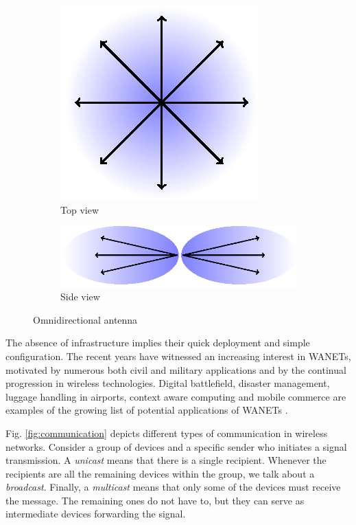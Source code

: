 \begin{figure}[htb!]
    \centering
    \begin{subfigure}[b]{0.35\textwidth}
        \includegraphics{figurer/omni-top.eps}
        \caption{Top view}
        \label{fig:omni-top}
    \end{subfigure}
    \begin{subfigure}[b]{0.55\textwidth}
        \includegraphics{figurer/omni-side.eps}
        \caption{Side view}
        \label{fig:omni-side}
    \end{subfigure}
  \label{fig:omni}
  \caption{Omnidirectional antenna}
\end{figure}

The absence of infrastructure implies their quick deployment and simple configuration.
The recent years have witnessed an increasing interest in WANETs, motivated by numerous both civil and military applications and by the continual progression in wireless technologies.
Digital battlefield, disaster management, luggage handling in airports, context aware computing and mobile commerce are examples of the growing list of potential applications of WANETs \cite{younis06}.

Fig. \ref{fig:communication} depicts different types of communication in wireless networks.
Consider a group of devices and a specific sender who initiates a signal transmission. 
A \emph{unicast} means that there is a single recipient.
Whenever the recipients are all the remaining devices within the group, we talk about a \emph{broadcast}.
Finally, a \emph{multicast} means that only some of the devices must receive the message. 
The remaining ones do not have to, but they can serve as intermediate devices forwarding the signal.

